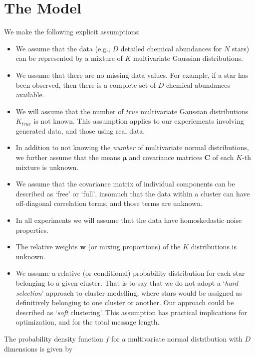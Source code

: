 \documentclass{aastex61}
\newcommand{\vect}[1]{\boldsymbol{\mathbf{#1}}}
\def\veccov{\vect{C}}
\def\vecmean{\vect{\mu}}
\def\weight{w}
\def\weights{\vect{\weight}}
\begin{document}
\section{The Model}
\label{sec:the-model}


We make the following explicit assumptions:

\begin{itemize}
  \item We assume that the data (e.g., $D$ detailed chemical abundances for
        $N$ stars) can be represented by a mixture of $K$ multivariate 
        Gaussian distributions.
  \item We assume that there are no missing data values. 
        For example, if a star has been observed, then there is a complete set
        of $D$ chemical abundances available.
  \item We will assume that the number of \emph{true} multivariate Gaussian
        distributions $K_{true}$ is not known. 
        This assumption applies to our experiements involving generated data, 
        and those using real data.
  \item In addition to not knowing the \emph{number} of multivariate normal
        distributions, we further assume that the means $\vecmean$ and 
        covariance matrices $\veccov$ of each $K$-th mixture is unknown.
  \item We assume that the covariance matrix of individual components can be
        described as `free' or `full', insomuch that the data within a cluster
        can have off-diagonal correlation terms, and those terms are unknown.
  \item In all experiments we will assume that the data have homoskedastic 
        noise properties.
  \item The relative weights $\weights$ (or mixing proportions) of the $K$ 
        distributions is unknown. 
  \item We assume a relative (or conditional) probability distribution for 
        each star belonging to a given cluster. That is to say that we do not 
        adopt a `\emph{hard selection}' approach to cluster modelling, where 
        stars would be assigned as definitively belonging to one cluster or 
        another. 
        Our approach could be described as `\emph{soft} clustering'.
        This assumption has practical implications for optimization, and for
        the total message length.
\end{itemize}


\noindent{}The probability density function $f$ for a multivariate normal 
distribution with $D$ dimensions is given by
\end{document}

